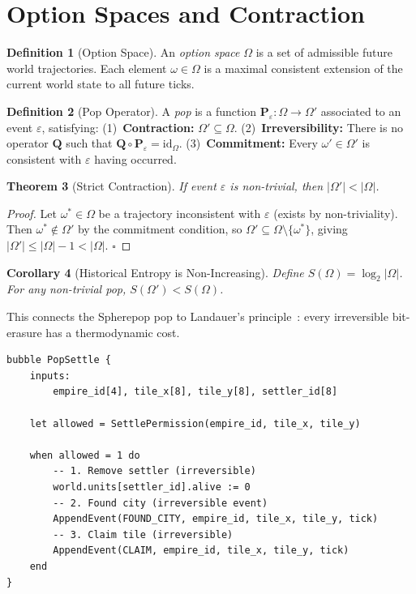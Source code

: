 \documentclass[11pt,a4paper,openany]{book}
\theoremstyle{plain}
\newtheorem{theorem}{Theorem}[chapter]
\newtheorem{corollary}[theorem]{Corollary}
\theoremstyle{definition}
\newtheorem{definition}[theorem]{Definition}
\theoremstyle{remark}
\newenvironment{implementation}{%
  \begin{mdframed}[
    linecolor=sphereamber!80, backgroundcolor=sphereamber!5,
    linewidth=1pt, innertopmargin=8pt, innerbottommargin=8pt,
    innerleftmargin=10pt, innerrightmargin=10pt,
    skipabove=10pt, skipbelow=6pt
  ]%
  \setlength{\parindent}{0pt}%
  \noindent{\textcolor{sphereamber!80!black}{\textbf{Implementation}}}\par\smallskip\ignorespaces
}{\end{mdframed}}
\begin{document}
\section{Option Spaces and Contraction}

\begin{definition}[Option Space]
  An \emph{option space} $\Omega$ is a set of admissible future world
  trajectories. Each element $\omega \in \Omega$ is a maximal consistent
  extension of the current world state to all future ticks.
\end{definition}

\begin{definition}[Pop Operator]
  A \emph{pop} is a function $\mathbf{P}_\varepsilon : \Omega \to \Omega'$
  associated to an event $\varepsilon$, satisfying:
  (1)~\textbf{Contraction:} $\Omega' \subseteq \Omega$.
  (2)~\textbf{Irreversibility:} There is no operator $\mathbf{Q}$ such
  that $\mathbf{Q} \circ \mathbf{P}_\varepsilon = \mathrm{id}_\Omega$.
  (3)~\textbf{Commitment:} Every $\omega' \in \Omega'$ is consistent with
  $\varepsilon$ having occurred.
\end{definition}

\begin{theorem}[Strict Contraction]
  If event $\varepsilon$ is non-trivial, then $|\Omega'| < |\Omega|$.
\end{theorem}
\begin{proof}
  Let $\omega^* \in \Omega$ be a trajectory inconsistent with $\varepsilon$
  (exists by non-triviality). Then $\omega^* \notin \Omega'$ by the
  commitment condition, so $\Omega' \subseteq \Omega \setminus \{\omega^*\}$,
  giving $|\Omega'| \leq |\Omega| - 1 < |\Omega|$. $\square$
\end{proof}

\begin{corollary}[Historical Entropy is Non-Increasing]
  Define $S(\Omega) = \log_2 |\Omega|$.
  For any non-trivial pop, $S(\Omega') < S(\Omega)$.
\end{corollary}

This connects the Spherepop pop to Landauer's principle~\cite{Landauer}:
every irreversible bit-erasure has a thermodynamic cost.

\begin{implementation}
\begin{lstlisting}[caption={Pop operator for city settlement}]
bubble PopSettle {
    inputs:
        empire_id[4], tile_x[8], tile_y[8], settler_id[8]

    let allowed = SettlePermission(empire_id, tile_x, tile_y)

    when allowed = 1 do
        -- 1. Remove settler (irreversible)
        world.units[settler_id].alive := 0
        -- 2. Found city (irreversible event)
        AppendEvent(FOUND_CITY, empire_id, tile_x, tile_y, tick)
        -- 3. Claim tile (irreversible)
        AppendEvent(CLAIM, empire_id, tile_x, tile_y, tick)
    end
}
\end{lstlisting}
\end{implementation}
\end{document}

